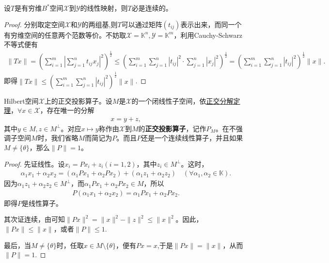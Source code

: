 \documentclass[../../main.tex]{subfiles}%
\begin{document}
\begin{proposition}
设$T$是有穷维$B^*$空间$\mathscr{X}$到$\mathscr{Y}$的线性映射，则$T$必是连续的。
\end{proposition}
\begin{proof}

分别取定空间$\mathscr{X}$和$\mathscr{Y}$的两组基,则$T$可以通过矩阵$(t_{ij})$表示出来，而同一个有穷维空间的任意两个范数等价。不妨取$\mathscr{X}=\mathbb{K}^n,\mathscr{Y}=\mathbb{K}^m$，利用Cauchy-Schwarz不等式便有
\begin{align*}
\|Tx\|=\left( \sum\limits_{i=1}^m \left| \sum\limits_{j=1}^n t_{ij}x_j \right|^2 \right)^{\frac{1}{2}}
\leqslant \left( \sum\limits_{i=1}^m \sum\limits_{j=1}^n |t_{ij}|^2 \cdot \sum\limits_{j=1}^n |x_j|^2 \right)^{\frac{1}{2}}
=\left( \sum\limits_{i=1}^m \sum\limits_{j=1}^n |t_{ij}|^2 \right)^{\frac{1}{2}} \|x\|.
\end{align*}
即得$\|Tx\|\leqslant \left( \sum\limits_{i=1}^m \sum\limits_{j=1}^n |t_{ij}|^2 \right)^{\frac{1}{2}} \|x\|$.

\end{proof}

\begin{theorem}
Hilbert空间$\mathscr{X}$上的正交投影算子。设$M$是$\mathscr{X}$的一个闭线性子空间，依\hyperref[corollary:泛函分析--正交分解定理]{正交分解定理}，$\forall x\in\mathscr{X}$，存在唯一的分解
\begin{align*}
x=y+z,
\end{align*}
其中$y\in M,z\in M^\perp$。对应$x\mapsto y$称作由$\mathscr{X}$到$M$的\textbf{正交投影算子}，记作$P_M$。在不强调子空间$M$时，我们省略$M$而简记为$P$。而且$P$还是一个连续线性算子，并且如果$M\neq\{\theta\}$，那么$\|P\|=1$。
\end{theorem}
\begin{proof}

先证线性。设$x_i=Px_i+z_i(i=1,2)$，其中$z_i\in M^\perp$。这时，
\begin{align*}
\alpha_1x_1+\alpha_2x_2=(\alpha_1Px_1+\alpha_2Px_2)+(\alpha_1z_1+\alpha_2z_2)\quad (\forall \alpha_1,\alpha_2\in\mathbb{K}).
\end{align*}
因为$\alpha_1z_1+\alpha_2z_2\in M^\perp$，而$\alpha_1Px_1+\alpha_2Px_2\in M$，所以
\begin{align*}
P(\alpha_1x_1+\alpha_2x_2)=\alpha_1Px_1+\alpha_2Px_2.
\end{align*}
即得$P$是线性算子。

其次证连续，由可知$\|Px\|^2=\|x\|^2-\|z\|^2\leqslant\|x\|^2$。因此，$\|Px\|\leqslant\|x\|$，或者$\|P\|\leqslant1$.

最后，当$M\neq\{\theta\}$时，任取$x\in M\setminus\{\theta\}$，便有$Px=x$,于是$\|Px\|=\|x\|$，从而$\|P\|=1$.

\end{proof}
\end{document}
